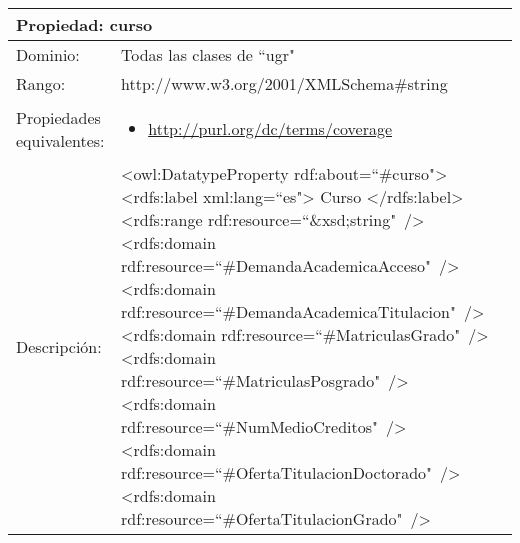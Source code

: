 \begin{table}[!ht]
	\centering
	\begin{tabular}{|p{}|p{}|}
		\hline
		\multicolumn{2}{|l|}{Propiedad: \textbf{curso}}
		\\ \hline
		Dominio:&
		Todas las clases de ``ugr"
		\\ \hline
		Rango:&
		http://www.w3.org/2001/XMLSchema\#string
		\\ \hline
		Propiedades \newline equivalentes:&
		\begin{itemize}
			\item \url{http://purl.org/dc/terms/coverage}
		\end{itemize}
		\\ \hline
		Descripción:&
		\textless owl:DatatypeProperty rdf:about=``\#curso"\textgreater\newline 
		\tab\textless rdfs:label xml:lang=``es"\textgreater\newline
		\tab\tab Curso\newline
		\tab\textless /rdfs:label\textgreater\newline
		\tab\textless rdfs:range\newline
		\tab\tab rdf:resource=``\&xsd;string"\ /\textgreater\newline
		\tab\textless rdfs:domain\newline
		\tab\tab rdf:resource=``\#DemandaAcademicaAcceso"\ /\textgreater\newline
		\tab\textless rdfs:domain\newline
		\tab\tab rdf:resource=``\#DemandaAcademicaTitulacion"\ /\textgreater\newline
		\tab\textless rdfs:domain\newline
		\tab\tab rdf:resource=``\#MatriculasGrado"\ /\textgreater\newline
		\tab\textless rdfs:domain\newline
		\tab\tab rdf:resource=``\#MatriculasPosgrado"\ /\textgreater\newline
		\tab\textless rdfs:domain\newline
		\tab\tab rdf:resource=``\#NumMedioCreditos"\ /\textgreater\newline
		\tab\textless rdfs:domain\newline
		\tab\tab rdf:resource=``\#OfertaTitulacionDoctorado"\ /\textgreater\newline
		\tab\textless rdfs:domain\newline
		\tab\tab rdf:resource=``\#OfertaTitulacionGrado"\ /\textgreater\newline

\end{tabular}
\end{table}
